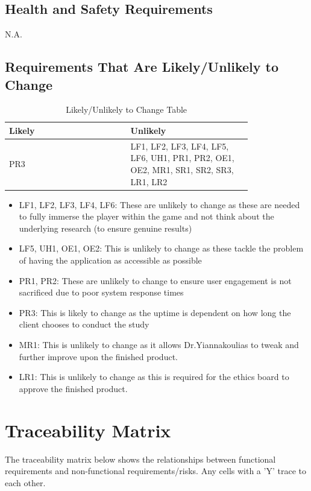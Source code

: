 \documentclass{article}
\begin{document}
\subsection{Health and Safety Requirements}
N.A.\\

\subsection{Requirements That Are Likely/Unlikely to Change}
\begin{table}[h]
    \centering
    \begin{tabular}{|p{0.40\linewidth} | p{0.40\linewidth}|}
    \hline
         Likely & Unlikely \\
         \hline
         PR3 & LF1, LF2, LF3, LF4, LF5, LF6, UH1, PR1, PR2, OE1, OE2, MR1, SR1, SR2, SR3, LR1, LR2     \\
         \hline
    \end{tabular}
    \caption{Likely/Unlikely to Change Table}
    \label{tab:my_label}
\end{table}
\begin{itemize}
    \item LF1, LF2, LF3, LF4, LF6: These are unlikely to change as these are needed to fully immerse the player within the game and not think about the underlying research (to ensure genuine results)
    \item LF5, UH1, OE1, OE2: This is unlikely to change as these tackle the problem of having the application as accessible as possible
    \item PR1, PR2: These are unlikely to change to ensure user engagement is not sacrificed due to poor system response times
    \item PR3: This is likely to change as the uptime is dependent on how long the client chooses to conduct the study
    \item MR1: This is unlikely to change as it allows Dr.Yiannakoulias to tweak and further improve upon the finished product.
    \item LR1: This is unlikely to change as this is required for the ethics board to approve the finished product.
    
\end{itemize}
\section{Traceability Matrix}

The traceability matrix below shows the relationships between functional requirements and non-functional requirements/risks. Any cells with a 'Y' trace to each other. 
\end{document}

